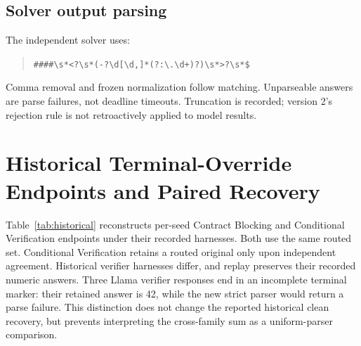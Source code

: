 \documentclass[journal,onecolumn]{IEEEtran}
\begin{document}
\begin{samepage}
\subsection{Solver output parsing}
The independent solver uses:
\begin{quote}\ttfamily\footnotesize
\verb|####\s*<?\s*(-?\d[\d,]*(?:\.\d+)?)\s*>?\s*$|
\end{quote}
Comma removal and frozen normalization follow matching. Unparseable answers are parse failures, not deadline timeouts. Truncation is recorded; version 2's rejection rule is not retroactively applied to model results.
\end{samepage}

\section{Historical Terminal-Override Endpoints and Paired Recovery}
\label{sec:s3}
Table~\ref{tab:historical} reconstructs per-seed Contract Blocking and Conditional Verification endpoints under their recorded harnesses. Both use the same routed set. Conditional Verification retains a routed original only upon independent agreement. Historical verifier harnesses differ, and replay preserves their recorded numeric answers. Three Llama verifier responses end in an incomplete terminal marker: their retained answer is 42, while the new strict parser would return a parse failure. This distinction does not change the reported historical clean recovery, but prevents interpreting the cross-family sum as a uniform-parser comparison.
\end{document}
